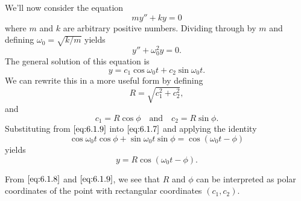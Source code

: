 \documentclass{ximera}
\begin{document}
\begin{example}
\begin{explanation}
\begin{center}
\end{center}

\end{explanation}
\end{example}
 
We'll now consider the equation
$$
my''+ky=0
$$
where $m$ and $k$ are arbitrary positive numbers. Dividing through by
$m$ and defining $\omega_0=\sqrt{k/m}$ yields
$$
y''+\omega_0^2y=0.
$$
The general solution of this equation is
\begin{equation}\label{eq:6.1.7}
y=c_1\cos\omega_0t+c_2\sin\omega_0t.
\end{equation}
We can rewrite this in a more useful form by defining
\begin{equation}\label{eq:6.1.8}
R=\sqrt{c_1^2+c_2^2},
\end{equation}
and
\begin{equation}\label{eq:6.1.9}
c_1=R\cos\phi\quad\mbox{and}\quad c_2=R\sin\phi.
\end{equation}
Substituting from $\eqref{eq:6.1.9}$ into $\eqref{eq:6.1.7}$ and applying the identity
$$
\cos\omega_0t\cos\phi+\sin\omega_0t\sin\phi=\cos(\omega_0t-\phi)
$$
yields
\begin{equation}\label{eq:6.1.10}
y=R\cos(\omega_0t-\phi).
\end{equation}
 
From $\eqref{eq:6.1.8}$ and $\eqref{eq:6.1.9}$, we see that $R$ and $\phi$
can be interpreted as polar coordinates of the point with rectangular coordinates $(c_1,c_2)$.
\end{document}
